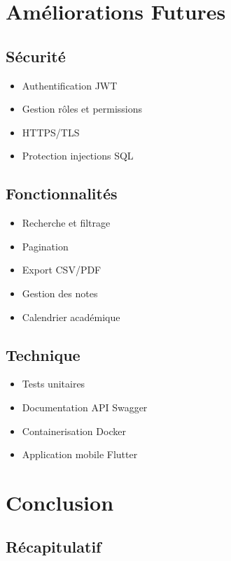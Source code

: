 \documentclass{article}
\begin{document}
\clearpage
\section{Améliorations Futures}

\subsection{Sécurité}
\begin{itemize}
    \item Authentification JWT
    \item Gestion rôles et permissions
    \item HTTPS/TLS
    \item Protection injections SQL
\end{itemize}

\subsection{Fonctionnalités}
\begin{itemize}
    \item Recherche et filtrage
    \item Pagination
    \item Export CSV/PDF
    \item Gestion des notes
    \item Calendrier académique
\end{itemize}

\subsection{Technique}
\begin{itemize}
    \item Tests unitaires
    \item Documentation API Swagger
    \item Containerisation Docker
    \item Application mobile Flutter
\end{itemize}

\clearpage
\section{Conclusion}

\subsection{Récapitulatif}
\end{document}
